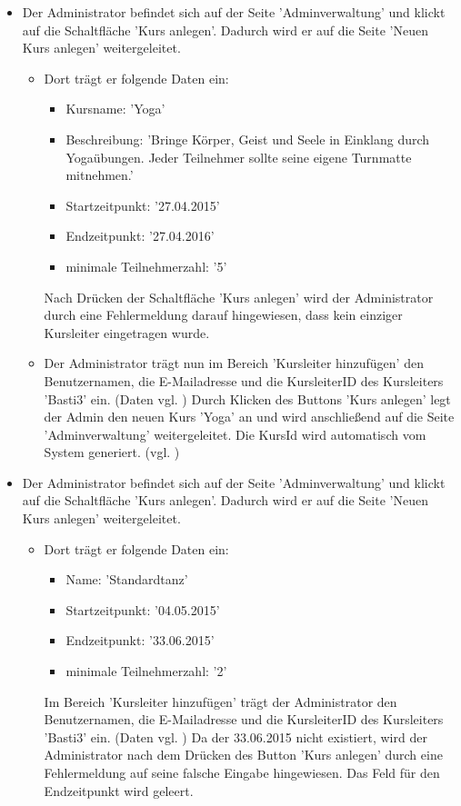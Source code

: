 \documentclass[a4paper]{scrreprt}
\begin{document}
\begin{itemize}
				\item {}
			 	 Der Administrator befindet sich auf der Seite 'Adminverwaltung' und klickt auf die Schaltfläche 'Kurs anlegen'. Dadurch wird er auf die Seite 'Neuen Kurs anlegen' weitergeleitet.
				 	 \begin{itemize} 
					 	 \item Dort trägt er folgende Daten ein:
							\begin{itemize}
								\item Kursname: 'Yoga'
								\item Beschreibung: 'Bringe Körper, Geist und Seele in Einklang durch Yogaübungen. Jeder Teilnehmer sollte seine eigene Turnmatte mitnehmen.'
								\item Startzeitpunkt: '27.04.2015'
								\item Endzeitpunkt: '27.04.2016'
								\item minimale Teilnehmerzahl: '5'
							\end{itemize}
							Nach Drücken der Schaltfläche 'Kurs anlegen' wird der Administrator durch eine Fehlermeldung darauf hingewiesen, dass kein einziger Kursleiter eingetragen wurde.
							
						 \item Der Administrator trägt nun im Bereich 'Kursleiter hinzufügen' den Benutzernamen, die E-Mailadresse und die KursleiterID des Kursleiters 'Basti3' ein. (Daten vgl. ) Durch Klicken des Buttons 'Kurs anlegen' legt der Admin den neuen Kurs 'Yoga' an und wird anschließend auf die Seite 'Adminverwaltung' weitergeleitet. Die KursId wird automatisch vom System generiert. (vgl. )
					\end{itemize}
					
				\item {}
				 Der Administrator befindet sich auf der Seite 'Adminverwaltung' und klickt auf die Schaltfläche 'Kurs anlegen'. Dadurch wird er auf die Seite 'Neuen Kurs anlegen' weitergeleitet.
					 \begin{itemize}
						\item Dort trägt er folgende Daten ein:
							\begin{itemize}
								\item Name: 'Standardtanz'
								\item Startzeitpunkt: '04.05.2015'
								\item Endzeitpunkt: '33.06.2015'
								\item minimale Teilnehmerzahl: '2'
							\end{itemize}
						Im Bereich 'Kursleiter hinzufügen' trägt der Administrator den Benutzernamen, die E-Mailadresse und die KursleiterID des Kursleiters 'Basti3' ein. (Daten vgl. ) Da der 33.06.2015 nicht existiert, wird der Administrator nach dem Drücken des Button 'Kurs anlegen' durch eine Fehlermeldung auf seine falsche Eingabe hingewiesen. Das Feld für den Endzeitpunkt wird geleert. 
						

\end{itemize}
\end{itemize}
\end{document}
